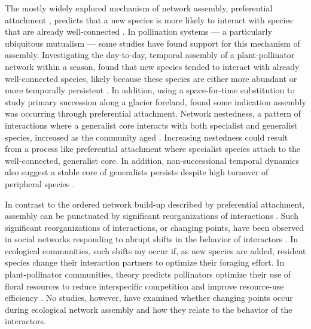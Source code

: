 \documentclass[12pt]{article}
\begin{document}
The mostly widely explored mechanism of network assembly, preferential
attachment \citep{barabasi1999emergence}, predicts that a new species
is more likely to interact with species that are already
well-connected \citep[''the rich-get-richer''
principle,][]{barabasi1999emergence}. In pollination systems --- a
particularly ubiquitous mutualism \citep{ollerton-2011-321,
  klein-2007-303} --- some studies have found support for this
mechanism of assembly. Investigating the day-to-day, temporal assembly
of a plant-pollinator network within a season, \cite{Olesen2008} found
that new species tended to interact with already well-connected
species, likely because these species are either more abundant or more
temporally persistent \citep{Olesen2008}. In addition, using a
space-for-time substitution to study primary succession along a
glacier foreland, \cite{albrecht2010plant} found some indication
assembly was occurring through preferential attachment. Network
nestedness, a pattern of interactions where a generalist core
interacts with both specialist and generalist species, increased as
the community aged \citep{albrecht2010plant}. Increasing nestedness
could result from a process like preferential attachment where
specialist species attach to the well-connected, generalist core.  In
addition, non-successional temporal dynamics also suggest a stable
core of generalists persists despite high turnover of peripheral
species \citep{fang2012relative, diaz2010changes, alarcon2008year}.

In contrast to the ordered network build-up described by preferential
attachment, assembly can be punctuated by significant reorganizations
of interactions \citep{peel2014detecting}. Such significant
reorganizations of interactions, or changing points, have been
observed in social networks responding to abrupt shifts in the
behavior of interactors \citep{peel2014detecting}.  In ecological
communities, such shifts my occur if, as new species are added,
resident species change their interaction partners to optimize their
foraging effort. In plant-pollinator communities, theory predicts
pollinators optimize their use of floral resources to reduce
interspecific competition and improve resource-use efficiency
\citep{pyke1984optimal, valdovinos2010consequences,
  valdovinos2013adaptive, albrecht2010plant, Bluthgen2007}. No
studies, however, have examined whether changing points occur during
ecological network assembly and how they relate to the behavior of the
interactors.
\end{document}

